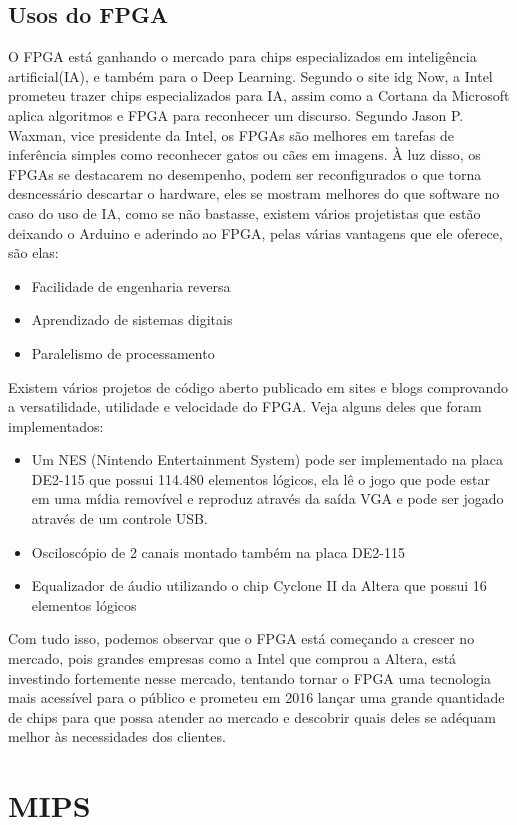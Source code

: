 \documentclass[12pt,a4paper]{article}
\begin{document}
\subsection{Usos do FPGA}
O FPGA está ganhando o mercado para chips especializados em inteligência artificial(IA), e também para o Deep Learning. Segundo o site idg Now, a Intel prometeu trazer chips especializados para IA, assim como a Cortana da Microsoft aplica algoritmos e FPGA para reconhecer um discurso. Segundo Jason P. Waxman, vice presidente da Intel, os FPGAs são melhores em tarefas de inferência simples como reconhecer gatos ou cães em imagens.
	À luz disso, os FPGAs se destacarem no desempenho, podem ser reconfigurados o que torna desncessário descartar o hardware, eles se mostram melhores do que software no caso do uso de IA, como se não bastasse, existem vários projetistas que estão deixando o Arduino e aderindo ao FPGA,  pelas várias vantagens que ele oferece, são elas:
	\begin{itemize}
	\item Facilidade de engenharia reversa
	\item Aprendizado de sistemas digitais
	\item Paralelismo de processamento
	\end{itemize}
	Existem vários projetos de código aberto publicado em sites e blogs comprovando a versatilidade, utilidade e velocidade do FPGA. Veja alguns deles que foram implementados:
	\begin{itemize}
	\item Um NES (Nintendo Entertainment System) pode ser implementado na placa DE2-115 que possui 114.480 elementos lógicos, ela lê o jogo que pode estar em uma mídia removível e reproduz através da saída VGA e pode ser jogado através de um controle USB.
	\item Osciloscópio de 2 canais montado também na placa DE2-115
	\item Equalizador de áudio utilizando o chip Cyclone II da Altera que possui 16  elementos lógicos
	\end{itemize}
		Com tudo isso, podemos observar que o FPGA está começando a crescer no mercado, pois grandes empresas como a Intel que comprou a Altera, está investindo fortemente nesse mercado, tentando tornar o FPGA uma tecnologia mais acessível para o público e prometeu em 2016 lançar uma grande quantidade de chips para que possa atender ao mercado e descobrir quais deles se adéquam melhor às necessidades dos clientes.
\section{MIPS}
\end{document}
